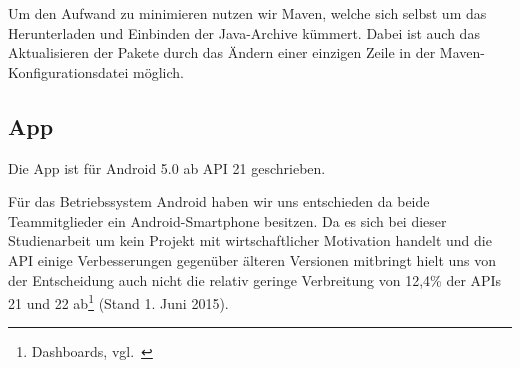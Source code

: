 Um den Aufwand zu minimieren nutzen wir Maven, welche sich selbst um das Herunterladen und Einbinden der Java-Archive kümmert. Dabei ist auch das Aktualisieren der Pakete durch das Ändern einer einzigen Zeile in der Maven-Konfigurationsdatei möglich.
\subsection{App}
Die App ist für Android 5.0 ab API 21 geschrieben. 

Für das Betriebssystem Android haben wir uns entschieden da beide Teammitglieder ein Android-Smartphone besitzen. Da es sich bei dieser Studienarbeit um kein Projekt mit wirtschaftlicher Motivation handelt und die API einige Verbesserungen gegenüber älteren Versionen mitbringt hielt uns von der Entscheidung auch nicht die relativ geringe Verbreitung von 12,4\% der APIs 21 und 22 ab\footnote{Dashboards, vgl.~\cite{verbreitung}} (Stand 1. Juni 2015).